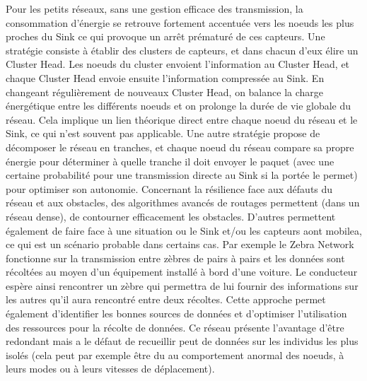 \documentclass[10pt, conference, compsocconf]{llncs}
\begin{document}
			Pour les petits réseaux, sans une gestion efficace des transmission, la consommation d'énergie se retrouve fortement accentuée vers les noeuds les plus proches du Sink ce qui provoque un arrêt prématuré de ces capteurs. Une stratégie consiste à établir des clusters de capteurs, et dans chacun d'eux élire un Cluster Head. Les noeuds du cluster envoient l'information au Cluster Head, et chaque Cluster Head envoie ensuite l'information compressée au Sink. En changeant régulièrement de nouveaux Cluster Head, on balance la charge énergétique entre les différents noeuds et on prolonge la durée de vie globale du réseau. Cela implique un lien théorique direct entre chaque noeud du réseau et le Sink, ce qui n'est souvent pas applicable. Une autre stratégie propose de décomposer le réseau en tranches, et chaque noeud du réseau compare sa propre énergie pour déterminer à quelle tranche il doit envoyer le paquet (avec une certaine probabilité pour une transmission directe au Sink si la portée le permet) pour optimiser son autonomie. Concernant la résilience face aux défauts du réseau et aux obstacles, des algorithmes avancés de routages permettent (dans un réseau dense), de contourner efficacement les obstacles. D'autres permettent également de faire face à une situation ou le Sink et/ou les capteurs aont mobilea, ce qui est un scénario probable dans certains cas. Par exemple le Zebra Network fonctionne sur la transmission entre zèbres de pairs à pairs et les données sont récoltées au moyen d'un équipement installé à bord d'une voiture. Le conducteur espère ainsi rencontrer un zèbre qui permettra de lui fournir des informations sur les autres qu'il aura rencontré entre deux récoltes. Cette approche permet également d'identifier les bonnes sources de données et d'optimiser l'utilisation des ressources pour la récolte de données. Ce réseau présente l'avantage d'être redondant mais a le défaut de recueillir peut de données sur les individus les plus isolés (cela peut par exemple être du au comportement anormal des noeuds, à leurs modes ou à leurs vitesses de déplacement). 


	
		
\end{document}
